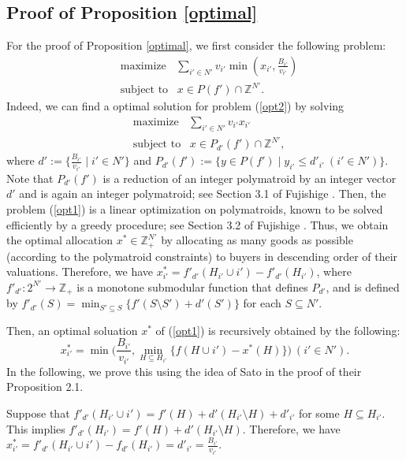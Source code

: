\documentclass[letterpaper,11pt]{article}
\begin{document}
\subsection{Proof of Proposition \ref{optimal}}
	For the proof of Proposition \ref{optimal}, we first consider the following problem:
	\begin{align}
	\label{opt2}
	&{\text{maximize}}\ \ \ \ \sum_{i'\in N'}v_{i'} \min(x_{i'}, \frac{B_{i'}}{v_{i'}})\\
	&\text{subject to}\ \ \ \, x\in P(f')\cap \mathbb Z^{N'}\nonumber.
	\end{align}
	Indeed, we can find a optimal solution for problem (\ref{opt2}) by solving 
	\begin{align}
	\label{opt1}
	&{\text{maximize}}\ \ \ \ \sum_{i'\in N'}v_{i'} x_{i'}\\
	&\text{subject to}\ \ \ \, x\in P_{d'}(f')\cap \mathbb Z^{N'}\nonumber,
	\end{align}
	where $d':=\{\frac{B_{i'}}{v_{i'}}\mid i'\in N'\}$ and 
	$P_{d'}(f'):=\{y\in P(f')\mid y_{i'}\leq d'_{i'}\ (i'\in N')\}$.
	Note that $P_{d'}(f')$ is a reduction of an integer polymatroid by an integer vector 
	$d'$ and is again an integer polymatroid; see Section 3.1 of Fujishige \cite{F2005}.
	Then, the problem (\ref{opt1}) is a linear optimization on polymatroids, 
	known to be solved efficiently by a greedy procedure; see Section 3.2 of Fujishige \cite{F2005}. 
	Thus, we obtain the optimal allocation $x^*\in \mathbb Z^{N'}_+$ by allocating as many goods as possible 
	(according to the polymatroid constraints) to buyers in descending order of their valuations.
	Therefore, we have $x^*_{i'}=f'_{d'}(H_{i'}\cup i')-f'_{d'}(H_{i'})$, where 
	$f'_{d'}:2^{N'}\to \mathbb Z_{+}$ is a monotone submodular function that defines $P_{d'}$, and is defined by  
	$f'_{d'}(S)=\min_{S'\subseteq S}\{f'(S\setminus S')+d'(S')\}$ for each $S\subseteq N'$.
	
	Then, an optimal soluation $x^{*}$ of (\ref{opt1}) is recursively obtained by the following:
	\begin{equation}
	\label{greedy}
	 x^{*}_{i'}=\min\bigl(\frac{B_{i'}}{v_{i'}},{\min_{H\subseteq H_{i'}}\{f(H\cup i')-x^{*}(H)}\}\bigr)\ (i'\in N').
	\end{equation}
	In the following, we prove this using the idea of Sato \cite{S2023} in the proof of their Proposition 2.1.
	
	Suppose that $f'_{d'}(H_{i'}\cup i')=f'(H)+d'(H_{i'}\setminus H)+d'_{i'}$ for some $H\subseteq H_{i'}$.
	This implies $f'_{d'}(H_{i'})=f'(H)+d'(H_{i'}\setminus H)$.
	Therefore, we have $x^*_{i'}=f'_{d'}(H_{i'}\cup i')-f_{d'}(H_{i'})=d'_{i'}=\frac{B_{i'}}{v_{i'}}$. 
	
\end{document}
